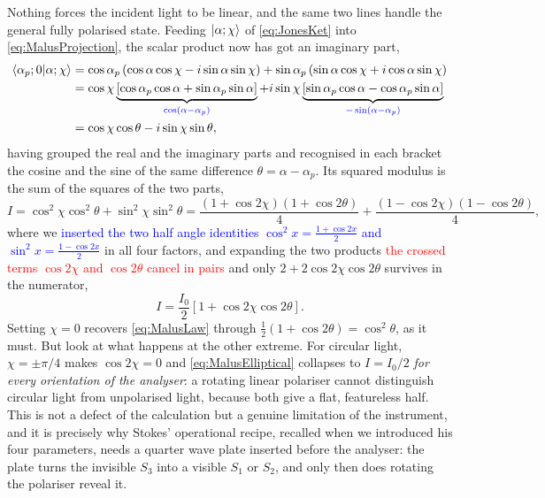             Nothing forces the incident light to be linear, and the same two lines handle the general fully polarised state. Feeding $\ket{\alpha;\chi}$ of \ref{eq:JonesKet} into \ref{eq:MalusProjection}, the scalar product now has got an imaginary part,
            \begin{align*}
                \braket{\alpha_p;0|\alpha;\chi} &= \cos\alpha_p\left(\cos\alpha\cos\chi-i\sin\alpha\sin\chi\right)+\sin\alpha_p\left(\sin\alpha\cos\chi+i\cos\alpha\sin\chi\right) \\
                &= \cos\chi\underbrace{\left[\cos\alpha_p\cos\alpha+\sin\alpha_p\sin\alpha\right]}_{\textcolor{blue}{\cos\left(\alpha-\alpha_p\right)}}+i\sin\chi\underbrace{\left[\sin\alpha_p\cos\alpha-\cos\alpha_p\sin\alpha\right]}_{\textcolor{blue}{-\sin\left(\alpha-\alpha_p\right)}} \\
                &= \cos\chi\cos\theta-i\sin\chi\sin\theta ,
            \end{align*}
            having grouped the real and the imaginary parts and recognised in each bracket the cosine and the sine of the same difference $\theta=\alpha-\alpha_p$. Its squared modulus is the sum of the squares of the two parts,
            \begin{equation*}
                I = \cos^2\chi\cos^2\theta+\sin^2\chi\sin^2\theta = \frac{\left(1+\cos2\chi\right)\left(1+\cos2\theta\right)}{4}+\frac{\left(1-\cos2\chi\right)\left(1-\cos2\theta\right)}{4},
            \end{equation*}
            where we \textcolor{blue}{inserted the two half angle identities $\cos^2x=\frac{1+\cos2x}{2}$ and $\sin^2x=\frac{1-\cos2x}{2}$} in all four factors, and expanding the two products \textcolor{red}{the crossed terms $\cos2\chi$ and $\cos2\theta$ cancel in pairs} and only $2+2\cos2\chi\cos2\theta$ survives in the numerator,
            \begin{equation}\label{eq:MalusElliptical}
                I = \frac{I_0}{2}\left[1+\cos2\chi\cos2\theta\right].
            \end{equation}
            Setting $\chi=0$ recovers \ref{eq:MalusLaw} through $\frac{1}{2}(1+\cos2\theta)=\cos^2\theta$, as it must. But look at what happens at the other extreme. For circular light, $\chi=\pm\pi/4$ makes $\cos2\chi=0$ and \ref{eq:MalusElliptical} collapses to $I=I_0/2$ \textit{for every orientation of the analyser}: a rotating linear polariser cannot distinguish circular light from unpolarised light, because both give a flat, featureless half. This is not a defect of the calculation but a genuine limitation of the instrument, and it is precisely why Stokes' operational recipe, recalled when we introduced his four parameters, needs a quarter wave plate inserted before the analyser: the plate turns the invisible $S_3$ into a visible $S_1$ or $S_2$, and only then does rotating the polariser reveal it.

